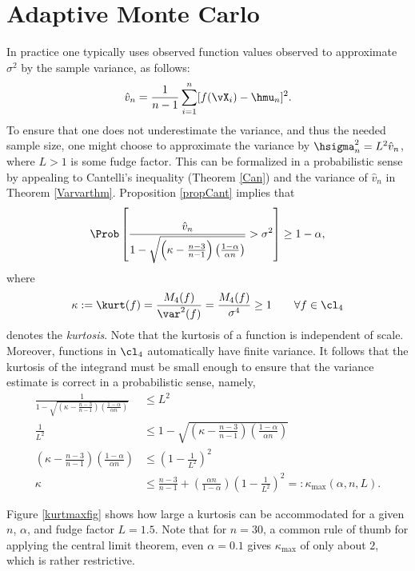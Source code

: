 \documentclass[12pt]{amsart}
\newcommand{\hv}{\hat{v}}
\begin{document}
\section{Adaptive Monte Carlo}

In practice one typically uses observed function values observed to approximate $\sigma^2$ by the sample variance, as follows:
\begin{equation} \label{samplevar}
\hv_{n} = \frac 1{n-1} \sum_{i=1}^{n} [f(\vX_i)- \hmu_{n}]^2.
\end{equation}
To ensure that one does not underestimate the variance, and thus the needed sample size, one might choose to approximate the variance by $\hsigma^2_n = L^2 \hv_n$, where $L > 1$ is some fudge factor. This can be formalized in a probabilistic sense by appealing to  Cantelli's inequality (Theorem \ref{Can}) and the variance of $\hv_n$ in Theorem \ref{Varvarthm}.  Proposition \ref{propCant} implies that
\[
\Prob\left[\frac{\hv_n}{1 - \sqrt{\left ( \kappa  - \frac{n-3}{n-1}\right)\left(\frac{1-\alpha}{\alpha n}\right)}} > \sigma^2 \right] \ge 1 - \alpha,
\]
where
\begin{equation} \label{kurtdef}
\kappa:= \kurt(f) = \frac{M_4(f)}{\var^2(f)} = \frac{M_4(f)}{\sigma^4} \ge 1 \qquad \forall f \in \cl_4
\end{equation}
denotes the \emph{kurtosis}.  Note that the kurtosis of a function is independent of scale.  Moreover, functions in $\cl_4$ automatically have finite variance.  It follows that the kurtosis of the integrand must be small enough to ensure that the variance estimate is correct in a probabilistic sense, namely, 
\begin{align}
\nonumber
\frac{1}{1 - \sqrt{\left ( \kappa  - \frac{n-3}{n-1}\right)\left(\frac{1-\alpha}{\alpha n}\right)}}  &\le L^2\\
\nonumber
\frac{1}{L^2} & \le 1 - \sqrt{\left ( \kappa  - \frac{n-3}{n-1}\right)\left(\frac{1-\alpha}{ \alpha n}\right)} \\
\nonumber
\left ( \kappa  - \frac{n-3}{n-1}\right)\left(\frac{1-\alpha}{ \alpha n}\right)   & \le \left(1 - \frac{1}{L^2}\right)^2\\
\kappa  & \le \frac{n-3}{n-1} + \left(\frac{ \alpha n}{1-\alpha}\right) \left(1 - \frac{1}{L^2}\right)^2 =: \kappa_{\max} (\alpha,n,L). \label{kappamaxdef}
\end{align}

Figure \ref{kurtmaxfig} shows how large a kurtosis can be accommodated for a given $n$, $\alpha$, and fudge factor $L=1.5$.  Note that for $n=30$, a common rule of thumb for applying the central limit theorem, even $\alpha=0.1$ gives $\kappa_{\max}$ of only about $2$, which is rather restrictive.
\end{document}

